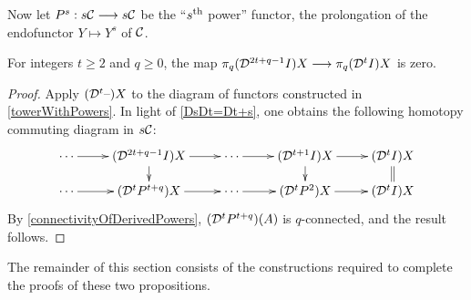 \documentclass[10pt]{article}
\newcommand{\Comm}{\calC}
\begin{document}
\begin{convergence}
Now let $P^s:s\Comm\to s\Comm$ be the ``$s^\textup{th}$ power'' functor, the prolongation of the endofunctor $Y\mapsto Y^s$ of $\Comm$.
\begin{prop}\label{convergenceProp}
For integers $t\geq2$ and $q\geq0$, the map $\pi_q(\mathcal{D}^{\smash{2t+q-1}}I)X\longrightarrow\pi_q(\mathcal{D}^{\smash{t}}I)X$ is zero.
\end{prop}
\begin{proof}%
Apply $(\mathcal{D}^{\smash{t}}\textup{--})X$ to the diagram of functors constructed in \ref{towerWithPowers}. In light of \ref{DsDt=Dt+s}, one obtains the following homotopy commuting diagram in $s\Comm$:
\[\xymatrix@R=4mm{
\cdots 
\ar[r]
&%
(\caldup{2t+q-1}I)X
\ar[r]
\ar[d]
&
\cdots \ar[r]
&%
(\caldup{t+1}I)X
\ar[r]
\ar[d]&%
(\caldup{t}I)X
\ar@{=}[d]
\\%
\cdots
\ar[r]
&%
(\caldup{t}P^{t+q})X
\ar[r]
&%
\cdots 
\ar[r]&%
(\caldup{t}P^2)X
\ar[r]
&%
(\caldup{t}I)X%
}\]
By \ref{connectivityOfDerivedPowers}, $(\mathcal{D}^{\smash{t}}P^{t+q})(A)$ is $q$-connected, and the result follows.
\end{proof}
The remainder of this section consists of the constructions required to complete the proofs of these two propositions.

\end{convergence}
\end{document}
